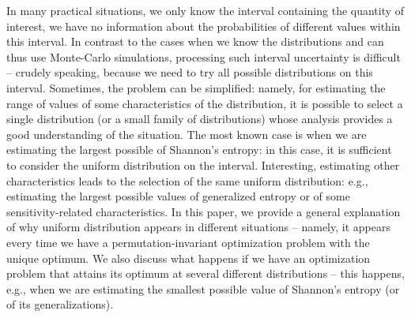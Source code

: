 
In many practical situations, we only know the interval containing
the quantity of interest, we have no information about the
probabilities of different values within this interval. In contrast
to the cases when we know the distributions and can thus use
Monte-Carlo simulations, processing such interval uncertainty is
difficult -- crudely speaking, because we need to try all possible
distributions on this interval. Sometimes, the problem can be
simplified: namely, for estimating the range of values of some characteristics of the distribution,
it is possible to select a single distribution
(or a small family of distributions) whose analysis provides a good
understanding of the situation. The most known case is when we are estimating the largest possible of Shannon's entropy: in this case, it is sufficient to consider the uniform distribution on
the interval. Interesting, estimating other characteristics leads to the selection of the same
uniform distribution: e.g., estimating the largest possible values of generalized entropy or of some sensitivity-related characteristics. 
In this paper, we provide a general
explanation of why uniform distribution appears in different
situations -- namely, it appears every time we have a
permutation-invariant optimization problem with the unique optimum.
We also discuss what happens if we have an optimization problem that attains its optimum at several 
different distributions -- this happens, e.g., when we are estimating the smallest possible 
value of Shannon's entropy (or of its generalizations).

